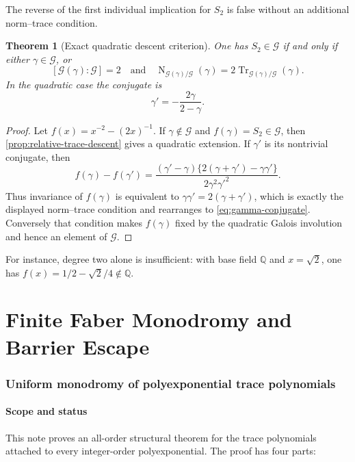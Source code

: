 \documentclass[11pt]{article}
\theoremstyle{keio}
\newtheorem{theorem}{Theorem}[section]
\theoremstyle{definition}
\theoremstyle{remark}
\newcommand{\Q}{\mathbb Q}
\newcommand{\Tr}{\operatorname{Tr}}
\newcommand{\Norm}{\operatorname{N}}
\newcommand{\calG}{\mathcal G}
\begin{document}
The reverse of the first individual implication for \(S_2\) is false without
an additional norm--trace condition.

\begin{theorem}[Exact quadratic descent criterion]
\label{thm:quadratic-descent}
One has \(S_2\in\calG\) if and only if either \(\gamma\in\calG\), or
\[
 [\calG(\gamma):\calG]=2
 \quad\text{and}\quad
 \Norm_{\calG(\gamma)/\calG}(\gamma)
 =2\Tr_{\calG(\gamma)/\calG}(\gamma).
\]
In the quadratic case the conjugate is
\begin{equation}\label{eq:gamma-conjugate}
 \gamma'=-\frac{2\gamma}{2-\gamma}.
\end{equation}
\end{theorem}

\begin{proof}
Let \(f(x)=x^{-2}-(2x)^{-1}\).  If \(\gamma\notin\calG\) and
\(f(\gamma)=S_2\in\calG\), then \cref{prop:relative-trace-descent} gives a
quadratic extension.  If \(\gamma'\) is its nontrivial conjugate, then
\[
 f(\gamma)-f(\gamma')
 =\frac{(\gamma'-\gamma)
 \{2(\gamma+\gamma')-\gamma\gamma'\}}
 {2\gamma^2{\gamma'}^2}.
\]
Thus invariance of \(f(\gamma)\) is equivalent to
\(\gamma\gamma'=2(\gamma+\gamma')\), which is exactly the displayed
norm--trace condition and rearranges to \eqref{eq:gamma-conjugate}.
Conversely that condition makes \(f(\gamma)\) fixed by the quadratic Galois
involution and hence an element of \(\calG\).
\end{proof}

For instance, degree two alone is insufficient: with base field \(\Q\) and
\(x=\sqrt2\), one has
\(f(x)=1/2-\sqrt2/4\notin\Q\).

\part{Finite Faber Monodromy and Barrier Escape}
\section{Uniform monodromy of polyexponential trace polynomials}

\subsection{Scope and status}

This note proves an all-order structural theorem for the trace polynomials
attached to every integer-order polyexponential. The proof has four parts:
\end{document}
